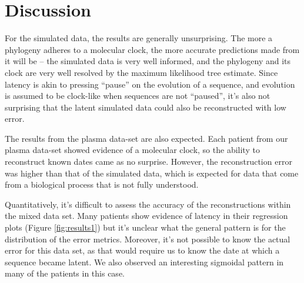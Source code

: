 \section{Discussion} \label{sec:discuss}
For the simulated data, the results are generally unsurprising. 
The more a phylogeny adheres to a molecular clock, the more accurate predictions made from it will be -- the simulated data is very well informed, and the phylogeny and its clock are very well resolved by the maximum likelihood tree estimate. 
Since latency is akin to pressing ``pause'' on the evolution of a sequence, and evolution is assumed to be clock-like when sequences are not ``paused'', it's also not surprising that the latent simulated data could also be reconstructed with low error. 

The results from the plasma data-set are also expected. 
Each patient from our plasma data-set showed evidence of a molecular clock, so the ability to reconstruct known dates came as no surprise. 
However, the reconstruction error was higher than that of the simulated data, which is expected for data that come from a biological process that is not fully understood.

Quantitatively, it's difficult to assess the accuracy of the reconstructions within the mixed data set. 
Many patients show evidence of latency in their regression plots (Figure \ref{fig:results1}) but it's unclear what the general pattern is for the distribution of the error metrics. Moreover, it's not possible to know the actual error for this data set, as that would require us to know the date at which a sequence became latent. 
We also observed an interesting sigmoidal pattern in many of the patients in this case.

